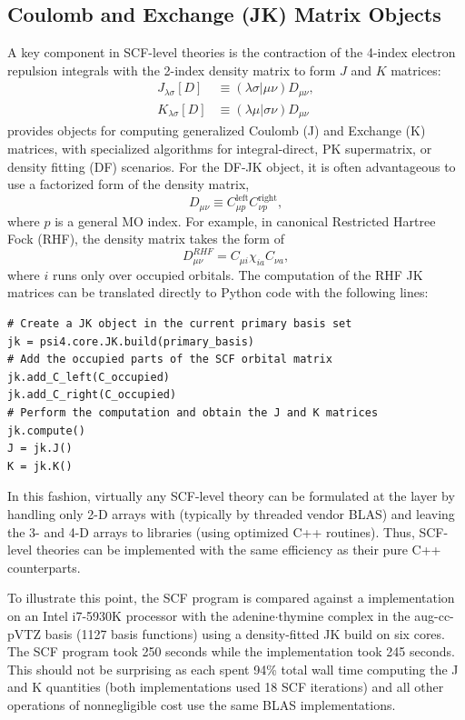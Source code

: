 \documentclass[%
  class = book,%
  crop = false,%
  float = true,%
  multi = true,%
  preview = false,%
]{standalone}
\let\cite\autocite
\begin{document}
\subsection{Coulomb and Exchange (JK) Matrix Objects}

A key component in SCF-level theories is the contraction of the 4-index electron repulsion integrals with the 2-index density matrix to form \(J\) and \(K\) matrices:
\begin{align}
  \label{eq:psi4numpy-coulomb}
  J_{\lambda \sigma}[D] &\equiv (\lambda\sigma|\mu\nu) D_{\mu\nu}, \\
  \label{eq:psi4numpy-exchange}
  K_{\lambda \sigma}[D] &\equiv (\lambda\mu|\sigma\nu) D_{\mu\nu}
\end{align}
\pfour provides objects for computing generalized Coulomb (J) and Exchange (K) matrices, with specialized algorithms for integral-direct, PK supermatrix\cite{20}, or density fitting (DF) scenarios.  For the DF-JK object, it is often advantageous to use a factorized form of the density matrix,
\begin{equation}
  D_{\mu\nu} \equiv C^\text{left}_{\mu p} C^\text{right}_{\nu p},
\end{equation}
where \(p\) is a general MO index. For example, in canonical Restricted Hartree Fock (RHF), the density matrix takes the form of
\begin{equation}
  D^{RHF}_{\mu\nu} = C_{\mu i} \chi_{ia} C_{\nu a},
\end{equation}
where \(i\) runs only over occupied orbitals. The computation of the RHF JK matrices can be translated directly to Python code with the following lines:

\begin{verbatim}
# Create a JK object in the current primary basis set
jk = psi4.core.JK.build(primary_basis)
# Add the occupied parts of the SCF orbital matrix
jk.add_C_left(C_occupied)
jk.add_C_right(C_occupied)
# Perform the computation and obtain the J and K matrices
jk.compute()
J = jk.J()
K = jk.K()
\end{verbatim}
In this fashion, virtually any SCF-level theory can be formulated at the \pfn layer by handling only 2-D arrays with \numpy (typically by threaded vendor BLAS) and leaving the 3- and 4-D arrays to \pfour libraries (using optimized C++ routines).  Thus, SCF-level theories can be implemented with the same efficiency as their pure C++ counterparts.

To illustrate this point, the \pfour SCF program is compared against a \pfn implementation on an Intel i7-5930K processor with the adenine\(\cdot\)thymine complex in the aug-cc-pVTZ basis (1127 basis functions) using a density-fitted JK build on six cores. The \pfour SCF program took 250 seconds while the \pfn implementation took 245 seconds. This should not be surprising as each spent 94\% total wall time computing the J and K quantities (both implementations used 18 SCF iterations) and all other operations of nonnegligible cost use the same BLAS implementations.
\end{document}
